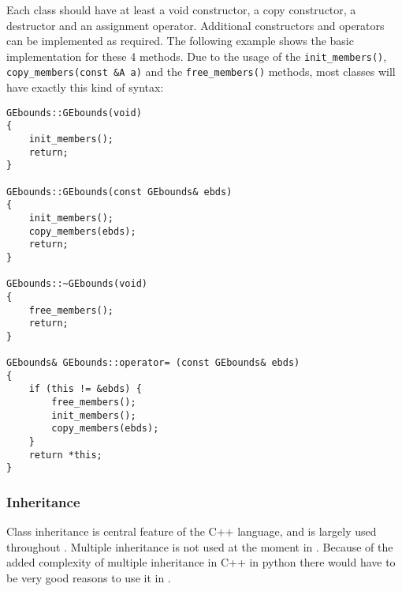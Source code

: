 \documentclass{article}[12pt,a4]
\begin{document}
Each class should have at least a void constructor, a copy constructor, a destructor and
an assignment operator.
Additional constructors and operators can be implemented as required.
The following example shows the basic implementation for these 4 methods.
Due to the usage of the {\tt init\_members()}, {\tt copy\_members(const \&A a)} and the
{\tt free\_members()} methods, most classes will have exactly this kind of syntax:
\begin{verbatim}
GEbounds::GEbounds(void)
{
    init_members();
    return;
}

GEbounds::GEbounds(const GEbounds& ebds)
{
    init_members();
    copy_members(ebds);
    return;
}

GEbounds::~GEbounds(void)
{
    free_members();
    return;
}

GEbounds& GEbounds::operator= (const GEbounds& ebds)
{
    if (this != &ebds) {
        free_members();
        init_members();
        copy_members(ebds);
    }
    return *this;
}
\end{verbatim}


\subsubsection{Inheritance}

Class inheritance is central feature of the C++ language, and is largely used throughout \this.
Multiple inheritance is not used at the moment in \this.
Because of the added complexity of multiple inheritance in C++ in python there would have to 
be very good reasons to use it in \this.
\end{document}
